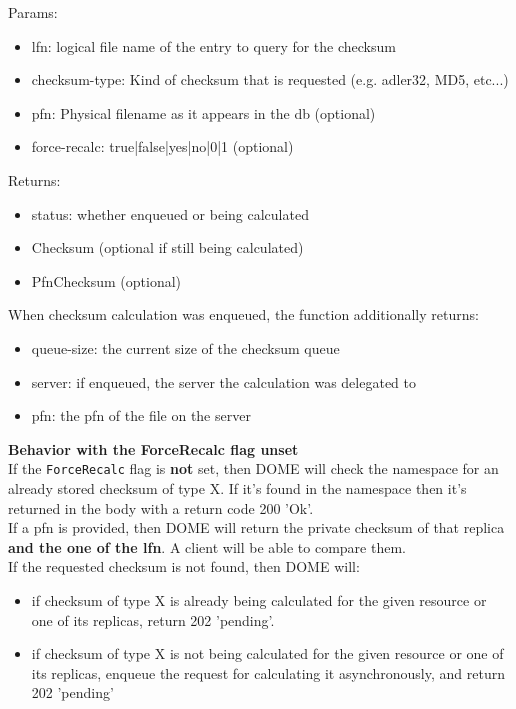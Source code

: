 \documentclass[a4paper,10pt]{scrreprt}
\begin{document}
Params:
\begin{itemize}
 \item lfn: logical file name of the entry to query for the checksum
 \item checksum-type: Kind of checksum that is requested (e.g. adler32, MD5, etc...)
 \item pfn: Physical filename as it appears in the db (optional)
 \item force-recalc: true|false|yes|no|0|1 (optional)
\end{itemize}

Returns:
\begin{itemize}
 \item status: whether enqueued or being calculated
 \item Checksum (optional if still being calculated)
 \item PfnChecksum (optional)

\end{itemize}

When checksum calculation was enqueued, the function additionally returns:
\begin{itemize}
 \item queue-size: the current size of the checksum queue
 \item server: if enqueued, the server the calculation was delegated to
 \item pfn: the pfn of the file on the server
\end{itemize}

\textbf{Behavior with the ForceRecalc flag unset}\\

If the \lstinline"ForceRecalc" flag is \textbf{not} set, then DOME will check
the namespace for an already stored checksum of type X. If it's found in the namespace then it's returned in the body with a return code 200 'Ok'.\\

If a pfn is provided, then DOME will return the private checksum of that replica \textbf{and the one of the lfn}. A client will be able to compare them.\\

If the requested checksum is not found, then DOME will:\\
\begin{itemize}
 \item if checksum of type X is already being calculated for the given resource or one of its replicas, return 202 'pending'.
 \item if checksum of type X is not being calculated for the given resource or one of its replicas, enqueue the request for calculating it asynchronously, and return 202 'pending'
\end{itemize}
\end{document}
